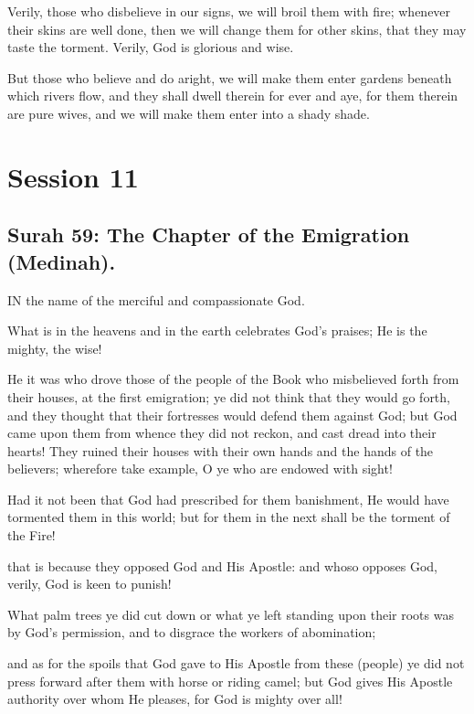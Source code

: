 \documentclass[fontsize=14pt, letterpaper, notitlepage, openany, DIV=12]{scrbook} %
\begin{document}
\noindent[4:56]
Verily, those who disbelieve in our signs, we will broil them with fire; whenever their
skins are well done, then we will change them for other skins, that they may taste the torment.
Verily, God is glorious and wise.

\noindent[4:57]
But those who believe and do aright, we will make them enter gardens beneath which
rivers flow, and they shall dwell therein for ever and aye, for them therein are pure wives, and
we will make them enter into a shady shade.

\clearpage
\chapter{Session 11}


\section{Surah 59: The Chapter of the Emigration (Medinah).}


IN the name of the merciful and compassionate God.

\noindent[59:1]
What is in the heavens and in the earth celebrates God's praises; He is the mighty, the
wise!

\noindent[59:2]
He it was who drove those of the people of the Book who misbelieved forth from their
houses, at the first emigration; ye did not think that they would go forth, and they thought that
their fortresses would defend them against God; but God came upon them from whence they did
not reckon, and cast dread into their hearts! They ruined their houses with their own hands and
the hands of the believers; wherefore take example, O ye who are endowed with sight!

\noindent[59:3]
Had it not been that God had prescribed for them banishment, He would have tormented
them in this world; but for them in the next shall be the torment of the Fire!

\noindent[59:4]
that is because they opposed God and His Apostle: and whoso opposes God, verily, God
is keen to punish!

\noindent[59:5]
What palm trees ye did cut down or what ye left standing upon their roots was by God's
permission, and to disgrace the workers of abomination;

\noindent[59:6]
and as for the spoils that God gave to His Apostle from these (people) ye did not press
forward after them with horse or riding camel; but God gives His Apostle authority over whom
He pleases, for God is mighty over all!
\end{document}
